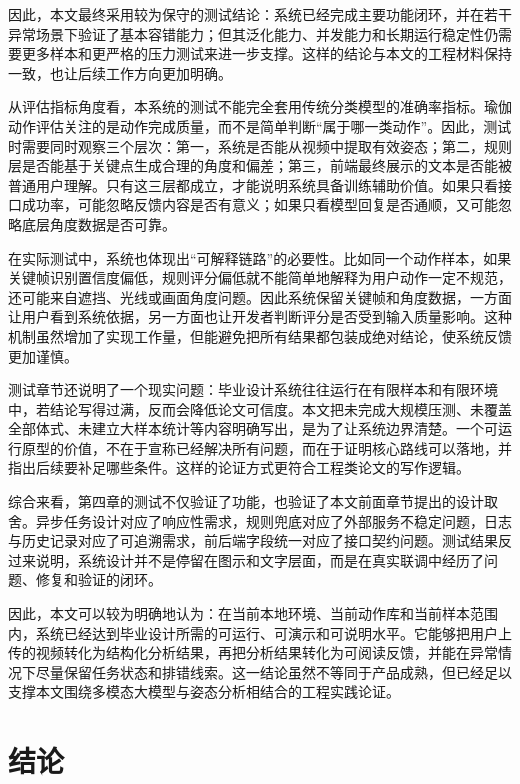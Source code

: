 \documentclass[UTF8,twoside]{ctexrep}
\makeatletter
\def@NAT@last@yr{\@citea}%
\def@NAT@last@yr{-\NAT@penalty}%
\makeatother
\begin{document}
因此，本文最终采用较为保守的测试结论：系统已经完成主要功能闭环，并在若干异常场景下验证了基本容错能力；但其泛化能力、并发能力和长期运行稳定性仍需要更多样本和更严格的压力测试来进一步支撑。这样的结论与本文的工程材料保持一致，也让后续工作方向更加明确。

从评估指标角度看，本系统的测试不能完全套用传统分类模型的准确率指标。瑜伽动作评估关注的是动作完成质量，而不是简单判断“属于哪一类动作”。因此，测试时需要同时观察三个层次：第一，系统是否能从视频中提取有效姿态；第二，规则层是否能基于关键点生成合理的角度和偏差；第三，前端最终展示的文本是否能被普通用户理解。只有这三层都成立，才能说明系统具备训练辅助价值。如果只看接口成功率，可能忽略反馈内容是否有意义；如果只看模型回复是否通顺，又可能忽略底层角度数据是否可靠。

在实际测试中，系统也体现出“可解释链路”的必要性。比如同一个动作样本，如果关键帧识别置信度偏低，规则评分偏低就不能简单地解释为用户动作一定不规范，还可能来自遮挡、光线或画面角度问题。因此系统保留关键帧和角度数据，一方面让用户看到系统依据，另一方面也让开发者判断评分是否受到输入质量影响。这种机制虽然增加了实现工作量，但能避免把所有结果都包装成绝对结论，使系统反馈更加谨慎。

测试章节还说明了一个现实问题：毕业设计系统往往运行在有限样本和有限环境中，若结论写得过满，反而会降低论文可信度。本文把未完成大规模压测、未覆盖全部体式、未建立大样本统计等内容明确写出，是为了让系统边界清楚。一个可运行原型的价值，不在于宣称已经解决所有问题，而在于证明核心路线可以落地，并指出后续要补足哪些条件。这样的论证方式更符合工程类论文的写作逻辑。

综合来看，第四章的测试不仅验证了功能，也验证了本文前面章节提出的设计取舍。异步任务设计对应了响应性需求，规则兜底对应了外部服务不稳定问题，日志与历史记录对应了可追溯需求，前后端字段统一对应了接口契约问题。测试结果反过来说明，系统设计并不是停留在图示和文字层面，而是在真实联调中经历了问题、修复和验证的闭环。

因此，本文可以较为明确地认为：在当前本地环境、当前动作库和当前样本范围内，系统已经达到毕业设计所需的可运行、可演示和可说明水平。它能够把用户上传的视频转化为结构化分析结果，再把分析结果转化为可阅读反馈，并能在异常情况下尽量保留任务状态和排错线索。这一结论虽然不等同于产品成熟，但已经足以支撑本文围绕多模态大模型与姿态分析相结合的工程实践论证。


\chapter*{结论}
\end{document}
